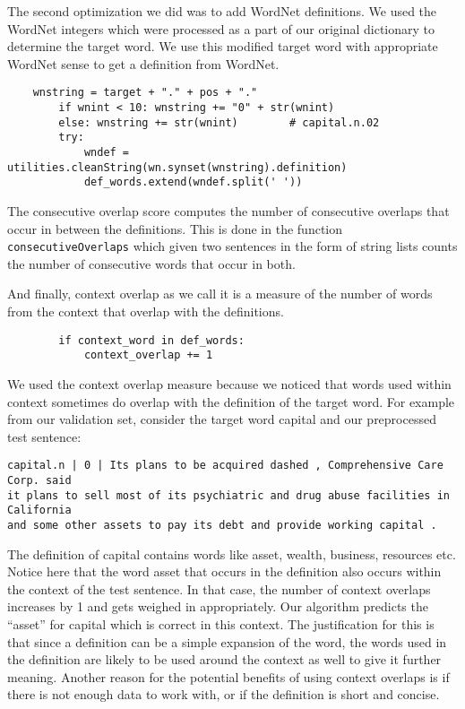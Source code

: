 \documentclass{article}
\begin{document}
The second optimization we did was to add WordNet definitions. We used the WordNet integers which were processed as a part of our original dictionary to determine the target word. We use this modified target word with appropriate WordNet sense to get a definition from WordNet.
{\small\begin{verbatim}
    wnstring = target + "." + pos + "."
        if wnint < 10: wnstring += "0" + str(wnint)
        else: wnstring += str(wnint)        # capital.n.02
        try:
            wndef = utilities.cleanString(wn.synset(wnstring).definition)
            def_words.extend(wndef.split(' '))
\end{verbatim}}

The consecutive overlap score computes the number of consecutive overlaps that occur in between the definitions. This is done in the function \texttt{consecutiveOverlaps} which given two sentences in the form of string lists counts the number of consecutive words that occur in both.\par
And finally, context overlap as we call it is a measure of the number of words from the context that overlap with the definitions.
{\small\begin{verbatim}        if context_word in def_words:
            context_overlap += 1
\end{verbatim}}
We used the context overlap measure because we noticed that words used within context sometimes do overlap with the definition of the target word. For example from our validation set, consider the target word capital and our preprocessed test sentence:

\begin{verbatim}
capital.n | 0 | Its plans to be acquired dashed , Comprehensive Care Corp. said
it plans to sell most of its psychiatric and drug abuse facilities in California
and some other assets to pay its debt and provide working capital .
\end{verbatim}

The definition of capital contains words like asset, wealth, business, resources etc. Notice here that the word asset that occurs in the definition also occurs within the context of the test sentence. In that case, the number of context overlaps increases by 1 and gets weighed in appropriately. Our algorithm predicts the ``asset'' for capital which is correct in this context. The justification for this is that since a definition can be a simple expansion of the word, the words used in the definition are likely to be used around the context as well to give it further meaning. Another reason for the potential benefits of using context overlaps is if there is not enough data to work with, or if the definition is short and concise.
\end{document}
